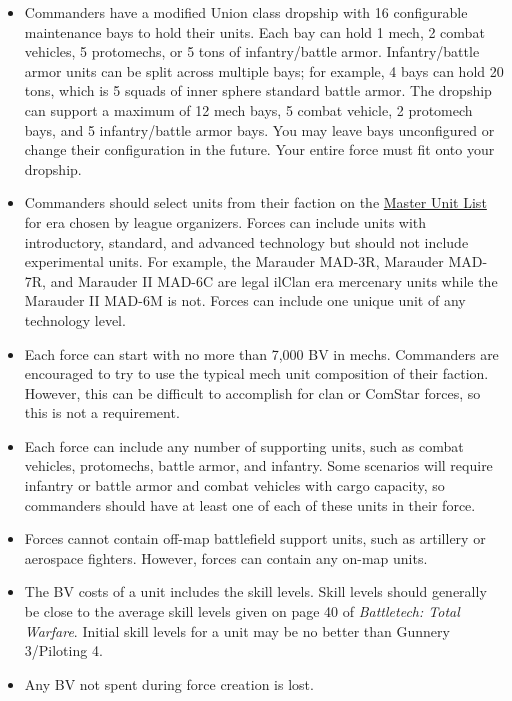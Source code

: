 \documentclass[UTF8]{article}
\begin{document}
\begin{itemize}

\item Commanders have a modified Union class dropship with 16 configurable maintenance bays to hold their units.
Each bay can hold 1 mech, 2 combat vehicles, 5 protomechs, or 5 tons of infantry/battle armor.
Infantry/battle armor units can be split across multiple bays; for example, 4 bays can hold 20 tons, which is 5 squads of inner sphere standard battle armor.
The dropship can support a maximum of 12 mech bays, 5 combat vehicle, 2 protomech bays, and 5 infantry/battle armor bays.
You may leave bays unconfigured or change their configuration in the future.
Your entire force must fit onto your dropship.

\item Commanders should select units from their faction on the \href{http://www.masterunitlist.info/}{Master Unit List} for era chosen by league organizers.
Forces can include units with introductory, standard, and advanced technology but should not include experimental units.
For example, the Marauder MAD-3R, Marauder MAD-7R, and Marauder II MAD-6C are legal ilClan era mercenary units while the Marauder II MAD-6M is not.
Forces can include one unique unit of any technology level.

\item Each force can start with no more than 7,000 BV in mechs.
Commanders are encouraged to try to use the typical mech unit composition of their faction.
However, this can be difficult to accomplish for clan or ComStar forces, so this is not a requirement.

\item Each force can include any number of supporting units, such as combat vehicles, protomechs, battle armor, and infantry.
Some scenarios will require infantry or battle armor and combat vehicles with cargo capacity, so commanders should have at least one of each of these units in their force.

\item Forces cannot contain off-map battlefield support units, such as artillery or aerospace fighters.
However, forces can contain any on-map units.

\item The BV costs of a unit includes the skill levels.
Skill levels should generally be close to the average skill levels given on page 40 of \emph{Battletech: Total Warfare}.
Initial skill levels for a unit may be no better than Gunnery 3/Piloting 4.

\item Any BV not spent during force creation is lost.

\end{itemize}
\end{document}
